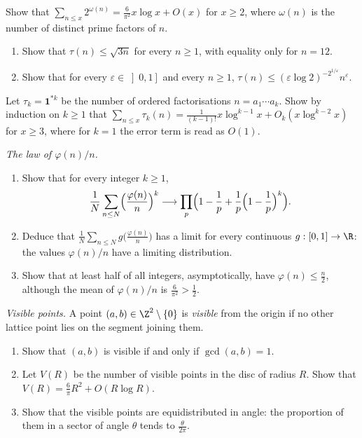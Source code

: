 \begin{exercise}[$\star\star$]\label{ex:twoomega}
Show that $\sum_{n\le x}2^{\omega(n)}=\frac6{\pi^2}x\log x+O(x)$ for $x\ge2$, where $\omega(n)$ is the number of distinct prime factors of $n$.
\end{exercise}

\begin{exercise}[$\star\star$]\label{ex:taubound}
\begin{enumerate}[label=(\alph*)]
\item Show that $\tau(n)\le\sqrt{3n}$ for every $n\ge1$, with equality only for $n=12$.
\item Show that for every $\varepsilon\in\left]0,1\right]$ and every $n\ge1$, $\tau(n)\le(\varepsilon\log2)^{-2^{1/\varepsilon}}n^\varepsilon$.
\end{enumerate}
\end{exercise}

\begin{exercise}[$\star\star$]\label{ex:tauk}
Let $\tau_k=\mathbf1^{*k}$ be the number of ordered factorisations $n=a_1\cdots a_k$. Show by induction on $k\ge1$ that
$\sum_{n\le x}\tau_k(n)=\frac1{(k-1)!}x\log^{k-1}x+O_k(x\log^{k-2}x)$ for $x\ge3$, where for $k=1$ the error term is read as $O(1)$.
\end{exercise}

\begin{exercise}[$\star\star$]\label{pb:phiovern}
\emph{The law of $\varphi(n)/n$.}
\begin{enumerate}[label=(\alph*)]
\item Show that for every integer $k\ge1$,
\[
\frac1N\sum_{n\le N}\Bigl(\frac{\varphi(n)}n\Bigr)^k\longrightarrow\prod_p\Bigl(1-\frac1p+\frac1p\Bigl(1-\frac1p\Bigr)^k\Bigr).
\]
\item Deduce that $\frac1N\sum_{n\le N}g\bigl(\frac{\varphi(n)}n\bigr)$ has a limit for every continuous $g:[0,1]\to\R$: the values
$\varphi(n)/n$ have a limiting distribution.
\item Show that at least half of all integers, asymptotically, have $\varphi(n)\le\frac n2$, although the mean of
$\varphi(n)/n$ is $\frac6{\pi^2}>\frac12$.
\end{enumerate}
\end{exercise}

\begin{exercise}[$\star\star$]\label{pb:visible}
\emph{Visible points.} A point $(a,b)\in\Z^2\setminus\{0\}$ is \emph{visible} from the origin if no other lattice point lies on the
segment joining them.
\begin{enumerate}[label=(\alph*)]
\item Show that $(a,b)$ is visible if and only if $\gcd(a,b)=1$.
\item Let $V(R)$ be the number of visible points in the disc of radius $R$. Show that $V(R)=\frac6\pi R^2+O(R\log R)$.
\item Show that the visible points are equidistributed in angle: the proportion of them in a sector of angle $\theta$ tends to
$\frac\theta{2\pi}$.
\end{enumerate}
\end{exercise}


